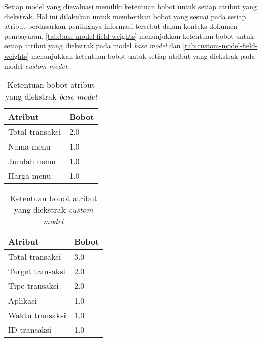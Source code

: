 Setiap model yang dievaluasi memiliki ketentuan bobot untuk setiap atribut yang diekstrak. Hal ini dilakukan untuk memberikan bobot yang sesuai pada setiap atribut berdasarkan pentingnya informasi tersebut dalam konteks dokumen pembayaran. \autoref{tab:base-model-field-weights} menunjukkan ketentuan bobot untuk setiap atribut yang diekstrak pada model \emph{base model} dan \autoref{tab:custom-model-field-weights} menunjukkan ketentuan bobot untuk setiap atribut yang diekstrak pada model \emph{custom model}.

\begin{table}[h!]
    \centering
    \caption{Ketentuan bobot atribut yang diekstrak \emph{base model}}
    \label{tab:base-model-field-weights}
    \begin{tabularx}{\textwidth}{|X|X|}
        \hline
        \textbf{Atribut} & \textbf{Bobot} \\ \hline
        Total transaksi & 2.0 \\ \hline
        Nama menu & 1.0 \\ \hline
        Jumlah menu & 1.0 \\ \hline
        Harga menu & 1.0 \\ \hline 
    \end{tabularx}
\end{table}

\begin{table}[h!]
    \centering
    \caption{Ketentuan bobot atribut yang diekstrak \emph{custom model}}
    \label{tab:custom-model-field-weights}
    \begin{tabularx}{\textwidth}{|X|X|}
        \hline
        \textbf{Atribut} & \textbf{Bobot} \\ \hline
        Total transaksi & 3.0 \\ \hline
        Target transaksi & 2.0 \\ \hline
        Tipe transaksi & 2.0 \\ \hline
        Aplikasi & 1.0 \\ \hline
        Waktu transaksi & 1.0 \\ \hline
        ID transaksi & 1.0 \\ \hline
    \end{tabularx}
\end{table}
